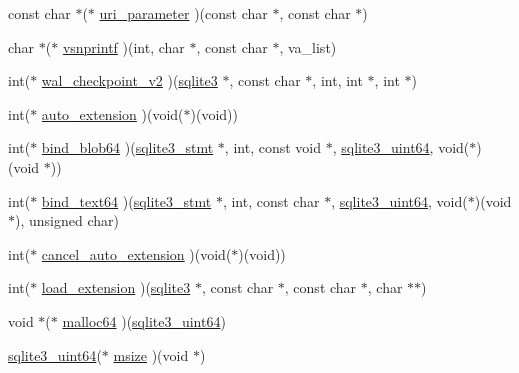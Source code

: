 \begin{DoxyCompactItemize}
\item 
const char $\ast$($\ast$ \hyperlink{structsqlite3__api__routines_add5f520297676876e836eec5c976c6ba}{uri\+\_\+parameter} )(const char $\ast$, const char $\ast$)
\item 
char $\ast$($\ast$ \hyperlink{structsqlite3__api__routines_aa6b21fe467cc3eabacec66d2d1f9bf4f}{vsnprintf} )(int, char $\ast$, const char $\ast$, va\+\_\+list)
\item 
int($\ast$ \hyperlink{structsqlite3__api__routines_a86ce375053098d8fbb2d686e9d98d12e}{wal\+\_\+checkpoint\+\_\+v2} )(\hyperlink{sqlite3_8h_a0ef6f2646262c8a9b24368d8ac140f69}{sqlite3} $\ast$, const char $\ast$, int, int $\ast$, int $\ast$)
\item 
int($\ast$ \hyperlink{structsqlite3__api__routines_a19d7b88cb46d7c9984c681eaf3ebf1a6}{auto\+\_\+extension} )(void($\ast$)(void))
\item 
int($\ast$ \hyperlink{structsqlite3__api__routines_aa34e69966762f91f4570cee3cb8f630f}{bind\+\_\+blob64} )(\hyperlink{sqlite3_8h_af2a033da1327cdd77f0a174a09aedd0c}{sqlite3\+\_\+stmt} $\ast$, int, const void $\ast$, \hyperlink{sqlite3_8h_a181c20ecfd72bc6627635746d382c610}{sqlite3\+\_\+uint64}, void($\ast$)(void $\ast$))
\item 
int($\ast$ \hyperlink{structsqlite3__api__routines_aab0cca7b94c71fa0e335cdbb17820ab5}{bind\+\_\+text64} )(\hyperlink{sqlite3_8h_af2a033da1327cdd77f0a174a09aedd0c}{sqlite3\+\_\+stmt} $\ast$, int, const char $\ast$, \hyperlink{sqlite3_8h_a181c20ecfd72bc6627635746d382c610}{sqlite3\+\_\+uint64}, void($\ast$)(void $\ast$), unsigned char)
\item 
int($\ast$ \hyperlink{structsqlite3__api__routines_ad2af85260429714c4bde212f2d0f0516}{cancel\+\_\+auto\+\_\+extension} )(void($\ast$)(void))
\item 
int($\ast$ \hyperlink{structsqlite3__api__routines_a33eef15b418c498b26cd052daf668f01}{load\+\_\+extension} )(\hyperlink{sqlite3_8h_a0ef6f2646262c8a9b24368d8ac140f69}{sqlite3} $\ast$, const char $\ast$, const char $\ast$, char $\ast$$\ast$)
\item 
void $\ast$($\ast$ \hyperlink{structsqlite3__api__routines_a2c977ab4d411d120321302b42e3c3139}{malloc64} )(\hyperlink{sqlite3_8h_a181c20ecfd72bc6627635746d382c610}{sqlite3\+\_\+uint64})
\item 
\hyperlink{sqlite3_8h_a181c20ecfd72bc6627635746d382c610}{sqlite3\+\_\+uint64}($\ast$ \hyperlink{structsqlite3__api__routines_a9cee16233cf2f31c23dbda654b1fdfc1}{msize} )(void $\ast$)
\item 
$$
\end{DoxyCompactItemize}
